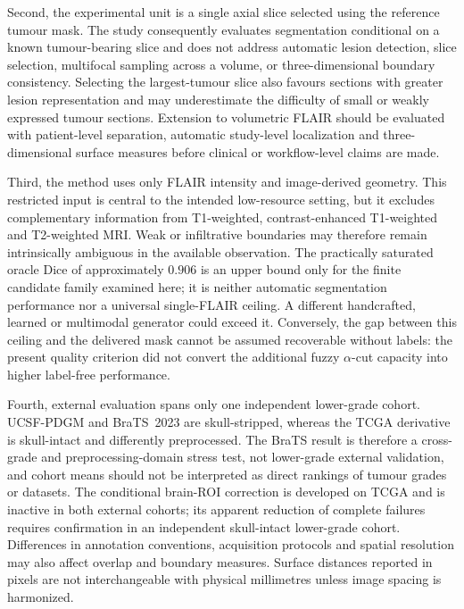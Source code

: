 \documentclass[11pt,a4paper]{article}
\begin{document}
Second, the experimental unit is a single axial slice selected using the
reference tumour mask. The study consequently evaluates segmentation conditional
on a known tumour-bearing slice and does not address automatic lesion detection,
slice selection, multifocal sampling across a volume, or three-dimensional
boundary consistency. Selecting the largest-tumour slice also favours sections
with greater lesion representation and may underestimate the difficulty of small
or weakly expressed tumour sections. Extension to volumetric FLAIR should be
evaluated with patient-level separation, automatic study-level localization and
three-dimensional surface measures before clinical or workflow-level claims are
made.

Third, the method uses only FLAIR intensity and image-derived geometry. This
restricted input is central to the intended low-resource setting, but it excludes
complementary information from T1-weighted, contrast-enhanced T1-weighted and
T2-weighted MRI. Weak or infiltrative boundaries may therefore remain
intrinsically ambiguous in the available observation. The practically saturated
oracle Dice of approximately $0.906$ is an upper bound only for the finite
candidate family examined here; it is neither automatic segmentation performance
nor a universal single-FLAIR ceiling. A different handcrafted, learned or
multimodal generator could exceed it. Conversely, the gap between this ceiling
and the delivered mask cannot be assumed recoverable without labels: the present
quality criterion did not convert the additional fuzzy $\alpha$-cut capacity into
higher label-free performance.

Fourth, external evaluation spans only one independent lower-grade cohort.
UCSF-PDGM and BraTS~2023 are skull-stripped, whereas the TCGA derivative is
skull-intact and differently preprocessed. The BraTS result is therefore a
cross-grade and preprocessing-domain stress test, not lower-grade external
validation, and cohort means should not be interpreted as direct rankings of
tumour grades or datasets. The conditional brain-ROI correction is developed on
TCGA and is inactive in both external cohorts; its apparent reduction of
complete failures requires confirmation in an independent skull-intact
lower-grade cohort. Differences in annotation conventions, acquisition protocols
and spatial resolution may also affect overlap and boundary measures. Surface
distances reported in pixels are not interchangeable with physical millimetres
unless image spacing is harmonized.
\end{document}
